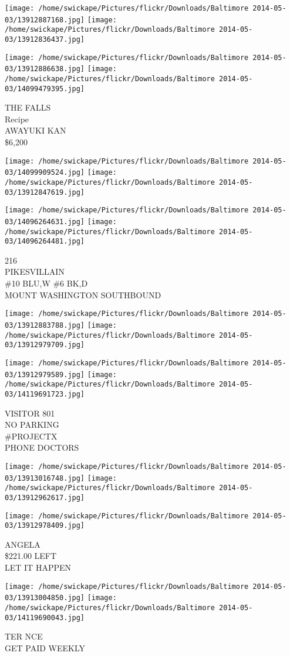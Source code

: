 \documentclass[10pt,letterpaper]{article}
\begin{document}
\texttt{[image: /home/swickape/Pictures/flickr/Downloads/Baltimore 2014-05-03/13912887168.jpg]}
\texttt{[image: /home/swickape/Pictures/flickr/Downloads/Baltimore 2014-05-03/13912836437.jpg]}

\texttt{[image: /home/swickape/Pictures/flickr/Downloads/Baltimore 2014-05-03/13912886638.jpg]}
\texttt{[image: /home/swickape/Pictures/flickr/Downloads/Baltimore 2014-05-03/14099479395.jpg]}

THE FALLS\\
Recipe\\
AWAYUKI KAN\\
\$6,200
\pagebreak

\texttt{[image: /home/swickape/Pictures/flickr/Downloads/Baltimore 2014-05-03/14099909524.jpg]}
\texttt{[image: /home/swickape/Pictures/flickr/Downloads/Baltimore 2014-05-03/13912847619.jpg]}

\texttt{[image: /home/swickape/Pictures/flickr/Downloads/Baltimore 2014-05-03/14096264631.jpg]}
\texttt{[image: /home/swickape/Pictures/flickr/Downloads/Baltimore 2014-05-03/14096264481.jpg]}

216\\
PIKESVILLAIN\\
\#10 BLU,W \#6 BK,D\\
MOUNT WASHINGTON SOUTHBOUND
\pagebreak

\texttt{[image: /home/swickape/Pictures/flickr/Downloads/Baltimore 2014-05-03/13912883788.jpg]}
\texttt{[image: /home/swickape/Pictures/flickr/Downloads/Baltimore 2014-05-03/13912979709.jpg]}

\texttt{[image: /home/swickape/Pictures/flickr/Downloads/Baltimore 2014-05-03/13912979589.jpg]}
\texttt{[image: /home/swickape/Pictures/flickr/Downloads/Baltimore 2014-05-03/14119691723.jpg]}

VISITOR 801\\
NO PARKING\\
\#PROJECTX\\
PHONE DOCTORS
\pagebreak

\texttt{[image: /home/swickape/Pictures/flickr/Downloads/Baltimore 2014-05-03/13913016748.jpg]}
\texttt{[image: /home/swickape/Pictures/flickr/Downloads/Baltimore 2014-05-03/13912962617.jpg]}

\vspace{0.25in}
\texttt{[image: /home/swickape/Pictures/flickr/Downloads/Baltimore 2014-05-03/13912978409.jpg]}

ANGELA\\
\$221.00 LEFT\\
LET IT HAPPEN
\pagebreak

\texttt{[image: /home/swickape/Pictures/flickr/Downloads/Baltimore 2014-05-03/13913004850.jpg]}
\texttt{[image: /home/swickape/Pictures/flickr/Downloads/Baltimore 2014-05-03/14119690043.jpg]}

TER NCE\\
GET PAID WEEKLY
\pagebreak
\end{document}
